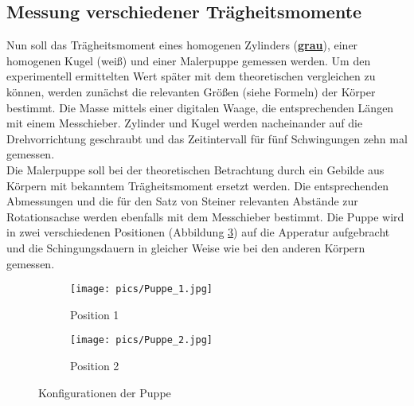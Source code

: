 \subsection{Messung verschiedener Trägheitsmomente}
Nun soll das Trägheitsmoment eines homogenen Zylinders (\textbf{\underline{grau}}), einer homogenen Kugel (weiß) und einer
Malerpuppe gemessen werden. Um den experimentell ermittelten Wert später mit dem theoretischen
vergleichen zu können, werden zunächst die relevanten Größen (siehe Formeln) der Körper
bestimmt. Die Masse mittels einer digitalen Waage, die entsprechenden Längen mit einem
Messchieber. Zylinder und Kugel werden nacheinander auf die Drehvorrichtung geschraubt und
das Zeitintervall für fünf Schwingungen zehn mal gemessen. \\
Die Malerpuppe soll bei der theoretischen Betrachtung durch ein Gebilde aus Körpern mit
bekanntem Trägheitsmoment ersetzt werden. Die entsprechenden Abmessungen und die für den Satz
von Steiner relevanten Abstände zur Rotationsachse werden ebenfalls mit dem Messchieber bestimmt.
Die Puppe wird in zwei verschiedenen Positionen (Abbildung \ref{fig:konfig}) auf die Apperatur aufgebracht
und die Schingungsdauern in gleicher Weise wie bei den anderen Körpern gemessen. \\

\begin{figure}
\centering
\begin{subfigure}{0.48\textwidth}
\centering
\texttt{[image: pics/Puppe\_1.jpg]}
\caption{Position 1}
\label{fig:pup1}
\end{subfigure}
\begin{subfigure}{0.48\textwidth}
\centering
\texttt{[image: pics/Puppe\_2.jpg]}
\caption{Position 2}
\label{fig:pup2}
\end{subfigure}
\caption{Konfigurationen der Puppe}
\label{fig:konfig}
\end{figure}
